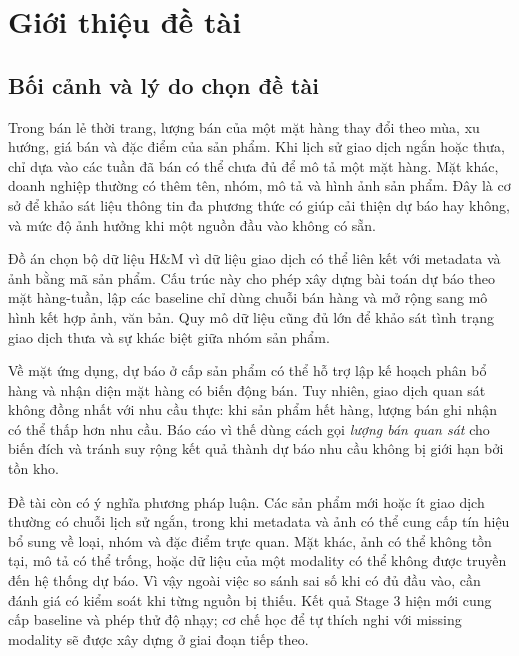 \documentclass[12pt,a4paper,oneside]{article}
\begin{document}
\clearpage
\tableofcontents
\clearpage
{}

\section{Giới thiệu đề tài}
\subsection{Bối cảnh và lý do chọn đề tài}
Trong bán lẻ thời trang, lượng bán của một mặt hàng thay đổi theo mùa, xu hướng, giá bán và đặc điểm của sản phẩm. Khi lịch sử giao dịch ngắn hoặc thưa, chỉ dựa vào các tuần đã bán có thể chưa đủ để mô tả một mặt hàng. Mặt khác, doanh nghiệp thường có thêm tên, nhóm, mô tả và hình ảnh sản phẩm. Đây là cơ sở để khảo sát liệu thông tin đa phương thức có giúp cải thiện dự báo hay không, và mức độ ảnh hưởng khi một nguồn đầu vào không có sẵn.

Đồ án chọn bộ dữ liệu H\&M vì dữ liệu giao dịch có thể liên kết với metadata và ảnh bằng mã sản phẩm. Cấu trúc này cho phép xây dựng bài toán dự báo theo mặt hàng-tuần, lập các baseline chỉ dùng chuỗi bán hàng và mở rộng sang mô hình kết hợp ảnh, văn bản. Quy mô dữ liệu cũng đủ lớn để khảo sát tình trạng giao dịch thưa và sự khác biệt giữa nhóm sản phẩm.

Về mặt ứng dụng, dự báo ở cấp sản phẩm có thể hỗ trợ lập kế hoạch phân bổ hàng và nhận diện mặt hàng có biến động bán. Tuy nhiên, giao dịch quan sát không đồng nhất với nhu cầu thực: khi sản phẩm hết hàng, lượng bán ghi nhận có thể thấp hơn nhu cầu. Báo cáo vì thế dùng cách gọi \emph{lượng bán quan sát} cho biến đích và tránh suy rộng kết quả thành dự báo nhu cầu không bị giới hạn bởi tồn kho.

Đề tài còn có ý nghĩa phương pháp luận. Các sản phẩm mới hoặc ít giao dịch thường có chuỗi lịch sử ngắn, trong khi metadata và ảnh có thể cung cấp tín hiệu bổ sung về loại, nhóm và đặc điểm trực quan. Mặt khác, ảnh có thể không tồn tại, mô tả có thể trống, hoặc dữ liệu của một modality có thể không được truyền đến hệ thống dự báo. Vì vậy ngoài việc so sánh sai số khi có đủ đầu vào, cần đánh giá có kiểm soát khi từng nguồn bị thiếu. Kết quả Stage 3 hiện mới cung cấp baseline và phép thử độ nhạy; cơ chế học để tự thích nghi với missing modality sẽ được xây dựng ở giai đoạn tiếp theo.
\end{document}
